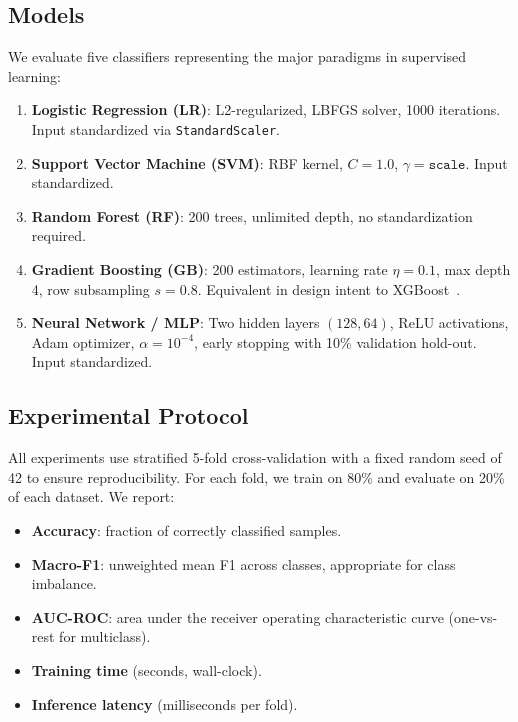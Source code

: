 \documentclass[10pt,twocolumn]{article}
\begin{document}
\subsection{Models}

We evaluate five classifiers representing the major paradigms in supervised learning:

\begin{enumerate}
  \item \textbf{Logistic Regression (LR)}: L2-regularized, LBFGS solver, 1000 iterations.
    Input standardized via \texttt{StandardScaler}.
  \item \textbf{Support Vector Machine (SVM)}: RBF kernel, $C=1.0$, $\gamma=\texttt{scale}$. 
    Input standardized.
  \item \textbf{Random Forest (RF)}: 200 trees, unlimited depth, no standardization required.
  \item \textbf{Gradient Boosting (GB)}: 200 estimators, learning rate $\eta=0.1$, max depth 4, 
    row subsampling $s=0.8$. Equivalent in design intent to XGBoost~\citep{chen2016xgboost}.
  \item \textbf{Neural Network / MLP}: Two hidden layers $(128, 64)$, ReLU activations, 
    Adam optimizer, $\alpha=10^{-4}$, early stopping with 10\% validation hold-out. 
    Input standardized.
\end{enumerate}

\subsection{Experimental Protocol}

All experiments use stratified 5-fold cross-validation with a fixed random seed of 42 
to ensure reproducibility. For each fold, we train on 80\% and evaluate on 20\% of each 
dataset. We report:
\begin{itemize}
  \item \textbf{Accuracy}: fraction of correctly classified samples.
  \item \textbf{Macro-F1}: unweighted mean F1 across classes, appropriate for class imbalance.
  \item \textbf{AUC-ROC}: area under the receiver operating characteristic curve 
    (one-vs-rest for multiclass).
  \item \textbf{Training time} (seconds, wall-clock).
  \item \textbf{Inference latency} (milliseconds per fold).
\end{itemize}
\end{document}
